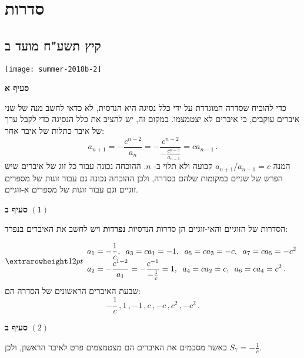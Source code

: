

\chapter{סדרות}



\section{קיץ תשע"ח מועד ב}

\begin{center}
\texttt{[image: summer-2018b-2]}
\end{center}
\vspace{-1ex}

\textbf{סעיף א}

כדי להוכיח שסדרה המוגדרת על ידי כלל נסיגה היא הנדסית, לא כדאי לחשב מנה של שני איברים עוקבים, כי איברים לא יצטמצמו. במקום זה, יש להציב את כלל הנסיגה כדי לקבל ערך של איבר כתלות של איבר אחר:
\[
a_{n+1} = -\frac{c^{n-2}}{a_n} = -\frac{c^{n-2}}{\displaystyle -\frac{c^{n-3}}{a_{n-1}}} = ca_{n-1}\,.
\]
המנה
$a_{n+1}/a_{n-1}=c$
קבועה ולא תלוי ב-%
$n$.
ההוכחה נכונה עבור כל זוג של איברים שיש הפרש של שניים במקומות שלהם בסדרה, ולכן ההוכחה נכונה גם עבור זוגות של מספרים זוגיים וגם עבור זוגות של מספרים א-זוגיים.

\smallskip

\textbf{סעיף ב}
$(1)$

הסדרות של הזוגיים והאי-זוגיים הן סדרות הנדסיות
\textbf{נפרדות}
ויש לחשב את האיברים בנפרד:

\vspace{-2ex}

\[
\erh{12pt}
\begin{array}{l}
a_1=-\displaystyle\frac{1}{c},\;\;a_3=ca_1=-1,\;\;a_5=ca_3=-c,\;\;a_7=ca_5=-c^2\\
a_2=\displaystyle
-\frac{c^{1-2}}{a_1}=
-\frac{c^{-1}}{-\frac{1}{c}}=1,\;\;a_4=ca_2=c,\;\;a_6=ca_4=c^2\,.
\end{array}
\]
שבעת האיברים הראשונים של הסדרה הם:
\[
-\frac{1}{c}\,,1\,, -1\,, c\,, -c\,, c^2\,, -c^2\,.
\]

\np

\textbf{סעיף ב}
$(2)$

כאשר מסכמים את האיברים הם מצטמצמים פרט לאיבר הראשון, ולכן
$S_7=-\frac{1}{c}$.

